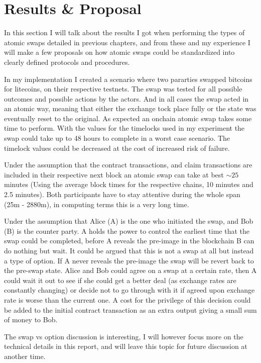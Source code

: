 \chapter{Results \& Proposal}
In this section I will talk about the results I got when performing the types of atomic swaps detailed in previous chapters, and from these and my experience I will make a few proposals on how atomic swaps could  be standardized into clearly defined protocols and procedures. 

In my implementation I created a scenario where two pararties swapped bitcoins for litecoins, on their respective testnets. 
The swap was tested for all possible outcomes and possible actions by the actors. And in all cases the swap acted in an atomic way, meaning that either the exchange tock place fully or the state was eventually reset to the original. 
As expected an onchain atomic swap takes some time to perform. With the values for the timelocks used in my experiment the swap could take up to 48 hours to complete in a worst case scenario. The timelock values could be decreased at the cost of increased risk of failure. 

Under the assumption that the contract transactions, and claim transactions are included in their respective next block an atomic swap can take at best $\sim25$ minutes (Using the average block times for the respective chains, 10 minutes and 2.5 minutes). Both participants have to stay attentive during the whole span (25m - 2880m), in computing terms this is a very long time. 

Under the assumption that Alice (A) is the one who initiated the swap, and Bob (B) is the counter party. A holds the power to control the earliest time that the swap could be completed, before A reveals the pre-image in the blockchain B can do nothing but wait. It could be argued that this is not a swap at all but instead a type of option. If A never reveals the pre-image the swap will be revert back to the pre-swap state. Alice and Bob could agree on a swap at a certain rate, then A could wait it out to see if she could get a better deal (as exchange rates are constantly changing) or decide not to go through with it if agreed upon exchange rate is worse than the current one. A cost for the privilege of this decision could be added to the initial contract transaction as an extra output giving a small sum of money to Bob. 

The swap vs option discussion is interesting, I will however focus more on the technical details in this report, and will leave this topic for future discussion at another time. 

